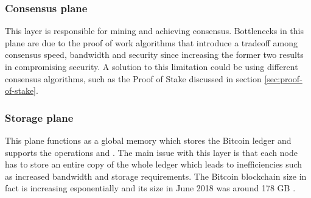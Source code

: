 \subsubsection{Consensus plane} This layer is responsible for mining and
achieving consensus. Bottlenecks in this plane are due to the proof of work
algorithms that introduce a tradeoff among consensus speed, bandwidth and
security since increasing the former two results in compromising security.
A solution to this limitation could be using different consensus algorithms, such
as the Proof of Stake discussed in section \ref{sec:proof-of-stake}.


\subsubsection{Storage plane} This plane functions as a global memory which
stores the Bitcoin ledger and supports the operations  and
. The main issue with this layer is that each node has to store an
entire copy of the whole ledger which leads to inefficiencies such as increased
bandwidth and storage requirements. The Bitcoin blockchain size in fact is
increasing esponentially and its size in June 2018 was around 178 GB
\cite{statista}. 
